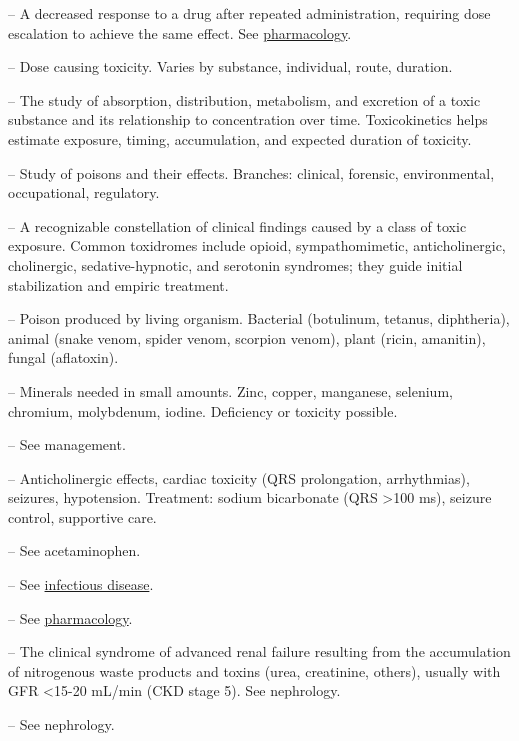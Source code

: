 -- A decreased response to a drug after repeated administration, requiring dose escalation to achieve the same effect. See \hyperlink{Pharmacology}{pharmacology}.

-- Dose causing toxicity. Varies by substance, individual, route, duration.

-- The study of absorption, distribution, metabolism, and excretion of a toxic substance and its relationship to concentration over time. Toxicokinetics helps estimate exposure, timing, accumulation, and expected duration of toxicity.

-- Study of poisons and their effects. Branches: clinical, forensic, environmental, occupational, regulatory.

-- A recognizable constellation of clinical findings caused by a class of toxic exposure. Common toxidromes include opioid, sympathomimetic, anticholinergic, cholinergic, sedative-hypnotic, and serotonin syndromes; they guide initial stabilization and empiric treatment.

-- Poison produced by living organism. Bacterial (botulinum, tetanus, diphtheria), animal (snake venom, spider venom, scorpion venom), plant (ricin, amanitin), fungal (aflatoxin).

-- Minerals needed in small amounts. Zinc, copper, manganese, selenium, chromium, molybdenum, iodine. Deficiency or toxicity possible.

-- See management.

-- Anticholinergic effects, cardiac toxicity (QRS prolongation, arrhythmias), seizures, hypotension. Treatment: sodium bicarbonate (QRS >100 ms), seizure control, supportive care.

-- See acetaminophen.

-- See \hyperlink{Infectious Disease}{infectious disease}.

-- See \hyperlink{Pharmacology}{pharmacology}.

-- The clinical syndrome of advanced renal failure resulting from the accumulation of nitrogenous waste products and toxins (urea, creatinine, others), usually with GFR <15-20 mL/min (CKD stage 5). See nephrology.

-- See nephrology.

